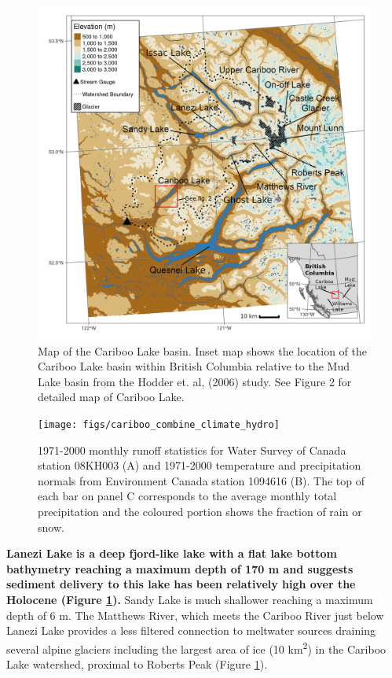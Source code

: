 \documentclass[Royal,times,doublespace,sageh]{sagej}
\begin{document}
\begin{figure}

{\centering \includegraphics[width=1\linewidth]{figs/cl_small_scale_inset_labels_gimp} 

}

\caption{Map of the Cariboo Lake basin. Inset map shows the location of the Cariboo Lake basin within British Columbia relative to the Mud Lake basin from the Hodder et. al, (2006) study. See Figure 2 for detailed map of Cariboo Lake.}\label{fig:map-basin}
\end{figure}

\begin{figure}

{\centering \texttt{[image: figs/cariboo\_combine\_climate\_hydro]} 

}

\caption{1971-2000 monthly runoff statistics for Water Survey of Canada station 08KH003 (A) and 1971-2000 temperature and precipitation normals from Environment Canada station 1094616 (B). The top of each bar on panel C corresponds to the average monthly total precipitation and the coloured portion shows the fraction of rain or snow.}\label{fig:cl-hydro}
\end{figure}

\textbf{Lanezi Lake is a deep fjord-like lake with a flat lake bottom
bathymetry reaching a maximum depth of 170 m and suggests sediment
delivery to this lake has been relatively high over the Holocene (Figure
\ref{fig:map-basin}).} Sandy Lake is much shallower reaching a maximum
depth of 6 m. The Matthews River, which meets the Cariboo River just
below Lanezi Lake provides a less filtered connection to meltwater
sources draining several alpine glaciers including the largest area of
ice (10 km\textsuperscript{2}) in the Cariboo Lake watershed, proximal
to Roberts Peak (Figure \ref{fig:map-basin}).
\end{document}
